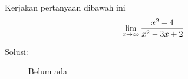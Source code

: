 \item
Kerjakan pertanyaan dibawah ini
\begin{equation}
\lim_{x\to\infty} \frac{x^2-4}{x^2-3x+2} \\ \nonumber
\end{equation}
\begin{description}
    \item[Solusi:]
        Belum ada
\end{description}
